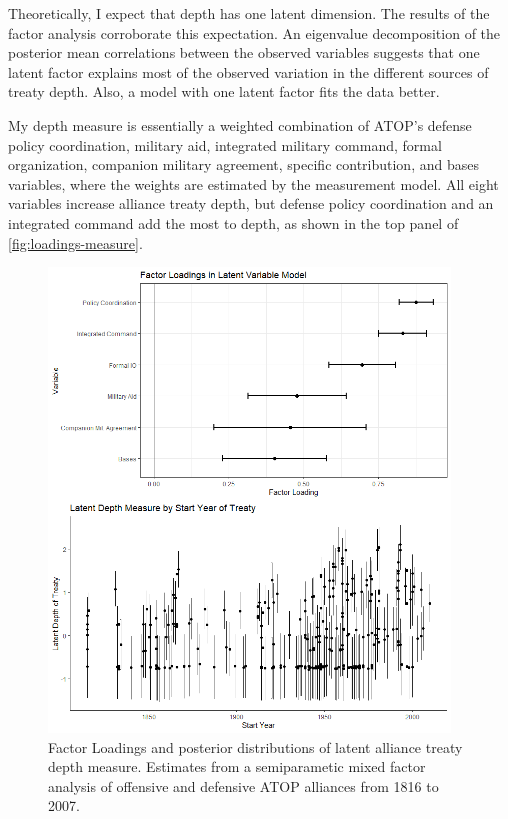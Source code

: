 \documentclass[12pt]{article}
\begin{document}
Theoretically, I expect that depth has one latent dimension. 
The results of the factor analysis corroborate this expectation.
An eigenvalue decomposition of the posterior mean correlations between the observed variables suggests that one latent factor explains most of the observed variation in the different sources of treaty depth. 
Also, a model with one latent factor fits the data better. 


My depth measure is essentially a weighted combination of ATOP's defense policy coordination, military aid, integrated military command, formal organization, companion military agreement, specific contribution, and bases variables, where the weights are estimated by the measurement model.  
All eight variables increase alliance treaty depth, but defense policy coordination and an integrated command add the most to depth, as shown in the top panel of \autoref{fig:loadings-measure}. 


\begin{figure}[hbtp]
\centering
\includegraphics[width=0.95\textwidth]{../figures/loadings-measure.png}
\caption{Factor Loadings and posterior distributions of latent alliance treaty depth measure. Estimates from a semiparametic mixed factor analysis of offensive and defensive ATOP alliances from 1816 to 2007.}
\label{fig:loadings-measure}
\end{figure}
\end{document}
